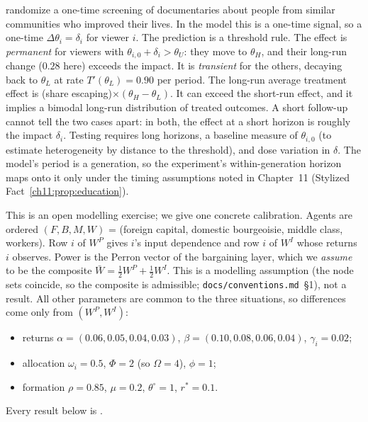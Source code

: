 \documentclass[../solutions_manual.tex]{subfiles}
\begin{document}
 \citet{bernard2014future} randomize a one-time screening of documentaries about people from similar communities who improved their lives. In the model this is a one-time signal, so a one-time $\Delta\theta_i = \delta_i$ for viewer $i$. The prediction is a threshold rule. The effect is \emph{permanent} for viewers with $\theta_{i,0} + \delta_i > \theta_U$: they move to $\theta_H$, and their long-run change ($0.28$ here) exceeds the impact. It is \emph{transient} for the others, decaying back to $\theta_L$ at rate $T'(\theta_L) = 0.90$ per period. The long-run average treatment effect is (share escaping)$\times(\theta_H - \theta_L)$. It can exceed the short-run effect, and it implies a bimodal long-run distribution of treated outcomes. A short follow-up cannot tell the two cases apart: in both, the effect at a short horizon is roughly the impact $\delta_i$. Testing requires long horizons, a baseline measure of $\theta_{i,0}$ (to estimate heterogeneity by distance to the threshold), and dose variation in $\delta$. The model's period is a generation, so the experiment's within-generation horizon maps onto it only under the timing assumptions noted in Chapter~11 (Stylized Fact~\ref{ch11:prop:education}).

This is an open modelling exercise; we give one concrete calibration. Agents are ordered $(F, B, M, W)$ = (foreign capital, domestic bourgeoisie, middle class, workers). Row $i$ of $W^P$ gives $i$'s input dependence and row $i$ of $W^I$ whose returns $i$ observes. Power is the Perron vector of the bargaining layer, which we \emph{assume} to be the composite $\bar W = \tfrac12 W^P + \tfrac12 W^I$. This is a modelling assumption (the node sets coincide, so the composite is admissible; \texttt{docs/conventions.md}~\S1), not a result. All other parameters are common to the three situations, so differences come only from $(W^P, W^I)$:
\begin{itemize}
\item returns $\alpha = (0.06, 0.05, 0.04, 0.03)$, $\beta = (0.10, 0.08, 0.06, 0.04)$, $\gamma_i = 0.02$;
\item allocation $\omega_i = 0.5$, $\Phi = 2$ (so $\Omega = 4$), $\phi = 1$;
\item formation $\rho = 0.85$, $\mu = 0.2$, $\theta^{\circ} = 1$, $r^* = 0.1$.
\end{itemize}
Every result below is \illustrative.
\end{document}
